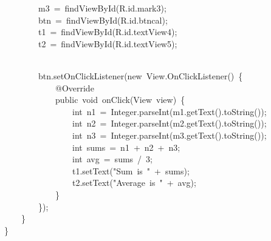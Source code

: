 {\ttfamily\small \ \ \ \ \ \ \ \ m3\ =\ findViewById(R.id.mark3);} \\
{\ttfamily\small \ \ \ \ \ \ \ \ btn\ =\ findViewById(R.id.btncal);} \\
{\ttfamily\small \ \ \ \ \ \ \ \ t1\ =\ findViewById(R.id.textView4);} \\
{\ttfamily\small \ \ \ \ \ \ \ \ t2\ =\ findViewById(R.id.textView5);} \\
\strut \\
{\ttfamily\small \ \ \ \ \ \ \ \ btn.setOnClickListener(new\ View.OnClickListener()\ \{} \\
{\ttfamily\small \ \ \ \ \ \ \ \ \ \ \ \ @Override} \\
{\ttfamily\small \ \ \ \ \ \ \ \ \ \ \ \ public\ void\ onClick(View\ view)\ \{} \\
{\ttfamily\small \ \ \ \ \ \ \ \ \ \ \ \ \ \ \ \ int\ n1\ =\ Integer.parseInt(m1.getText().toString());} \\
{\ttfamily\small \ \ \ \ \ \ \ \ \ \ \ \ \ \ \ \ int\ n2\ =\ Integer.parseInt(m2.getText().toString());} \\
{\ttfamily\small \ \ \ \ \ \ \ \ \ \ \ \ \ \ \ \ int\ n3\ =\ Integer.parseInt(m3.getText().toString());} \\
{\ttfamily\small \ \ \ \ \ \ \ \ \ \ \ \ \ \ \ \ int\ sums\ =\ n1\ +\ n2\ +\ n3;} \\
{\ttfamily\small \ \ \ \ \ \ \ \ \ \ \ \ \ \ \ \ int\ avg\ =\ sums\ /\ 3;} \\
{\ttfamily\small \ \ \ \ \ \ \ \ \ \ \ \ \ \ \ \ t1.setText("Sum\ is\ "\ +\ sums);} \\
{\ttfamily\small \ \ \ \ \ \ \ \ \ \ \ \ \ \ \ \ t2.setText("Average\ is\ "\ +\ avg);} \\
{\ttfamily\small \ \ \ \ \ \ \ \ \ \ \ \ \}} \\
{\ttfamily\small \ \ \ \ \ \ \ \ \});} \\
{\ttfamily\small \ \ \ \ \}} \\
{\ttfamily\small \}} \\
